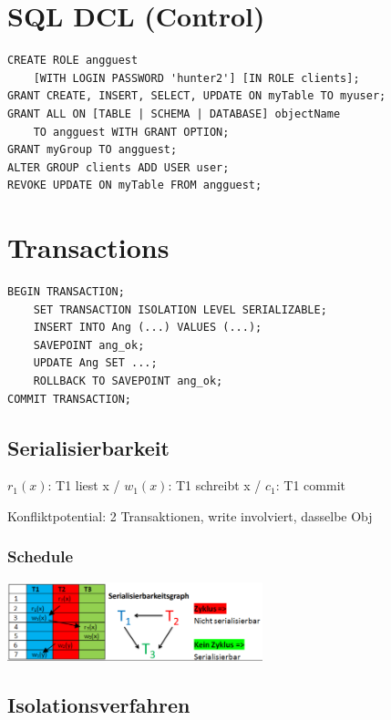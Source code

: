 \begin{multicols*}{3}
\section{SQL DCL (Control)}
\begin{verbatim}
CREATE ROLE angguest
    [WITH LOGIN PASSWORD 'hunter2'] [IN ROLE clients];
GRANT CREATE, INSERT, SELECT, UPDATE ON myTable TO myuser;
GRANT ALL ON [TABLE | SCHEMA | DATABASE] objectName
    TO angguest WITH GRANT OPTION;
GRANT myGroup TO angguest;
ALTER GROUP clients ADD USER user;
REVOKE UPDATE ON myTable FROM angguest;
\end{verbatim}

\section{Transactions}
\begin{verbatim}
BEGIN TRANSACTION;
    SET TRANSACTION ISOLATION LEVEL SERIALIZABLE;
    INSERT INTO Ang (...) VALUES (...);
    SAVEPOINT ang_ok;
    UPDATE Ang SET ...;
    ROLLBACK TO SAVEPOINT ang_ok;
COMMIT TRANSACTION;
\end{verbatim}


\subsection{Serialisierbarkeit}
$r_{1}(x)$: T1 liest x / $w_{1}(x)$: T1 schreibt x / $c_{1}$: T1 commit

Konfliktpotential: 2 Transaktionen, write involviert, dasselbe Obj

\newcommand{\ta}[2]{{\color{blue}#1_{1}#2}}
\newcommand{\tb}[2]{{\color{red}#1_{2}#2}}
\newcommand{\tc}[2]{{\color{green}#1_{3}#2}}

\subsubsection{Schedule}
\includegraphics[width=20em]{serial.png}

\subsection{Isolationsverfahren}


\end{multicols*}
